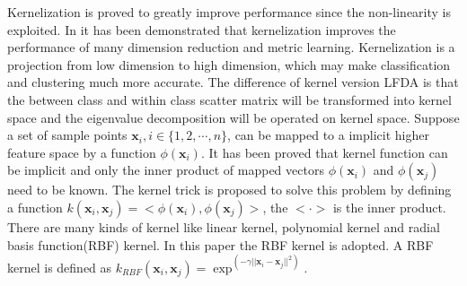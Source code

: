 \documentclass[conference,compsoc]{IEEEtran}
\begin{document}
 Kernelization is proved to greatly improve performance since the non-linearity is exploited. In \cite{KernelVersionMetrics} it has been demonstrated that kernelization improves the performance of many dimension reduction and metric learning. Kernelization is a projection from low dimension to high dimension, which may make classification and clustering much more accurate.  The difference of kernel version LFDA is that the between class and within class scatter matrix will be transformed into kernel space and the eigenvalue decomposition will be operated on kernel space.  Suppose a set of sample points $\bm{x}_i, i\in\{1,2,\cdots, n\} $, can be mapped to a implicit higher feature space by a function $\phi(\bm{x}_i)$. It has been proved that kernel function can be implicit and only the inner product of mapped vectors $\phi(\bm{x}_i)$ and $\phi(\bm{x}_j)$ need to be known. The kernel trick is proposed to solve this problem by defining a function $k(\bm{x}_i,\bm{x}_j) = <\phi(\bm{x}_i),\phi(\bm{x}_j)>$, the $< \cdot >$ is the inner product. There are many kinds of kernel like linear kernel, polynomial kernel and radial basis function(RBF) kernel. In this paper the RBF kernel is adopted. A RBF kernel is defined as $k_{RBF}(\bm{x}_i,\bm{x}_j) = \exp^{(-\gamma||\bm{x}_i-\bm{x}_j||^2)}$. 
 
 
\end{document}
